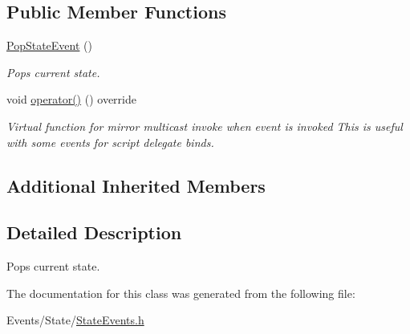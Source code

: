 \subsection*{Public Member Functions}
\begin{DoxyCompactItemize}
\item 
\mbox{\label{classPopStateEvent_a4faf57d5f1227310dde3269b421c9c23}} 
\hyperlink{classPopStateEvent_a4faf57d5f1227310dde3269b421c9c23}{Pop\+State\+Event} ()
\begin{DoxyCompactList}\small\item\em Pops current state. \end{DoxyCompactList}\item 
\mbox{\label{classPopStateEvent_a011d1b0579f19297ce93a65dea41a600}} 
void \hyperlink{classPopStateEvent_a011d1b0579f19297ce93a65dea41a600}{operator()} () override
\begin{DoxyCompactList}\small\item\em Virtual function for mirror multicast invoke when event is invoked This is useful with some events for script delegate binds. \end{DoxyCompactList}\end{DoxyCompactItemize}
\subsection*{Additional Inherited Members}


\subsection{Detailed Description}
Pops current state. 

The documentation for this class was generated from the following file\+:\begin{DoxyCompactItemize}
\item 
Events/\+State/\hyperlink{StateEvents_8h}{State\+Events.\+h}\end{DoxyCompactItemize}

